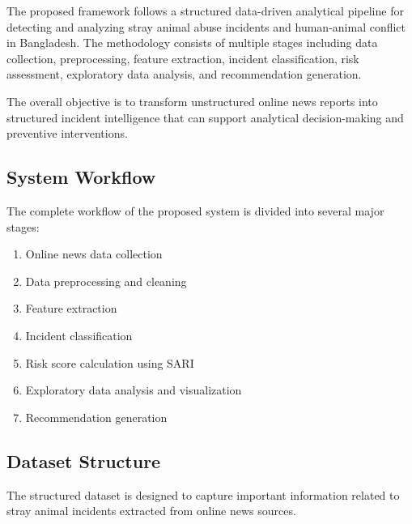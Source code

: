 \documentclass[conference]{IEEEtran}
\begin{document}
The proposed framework follows a structured data-driven analytical pipeline for detecting and analyzing stray animal abuse incidents and human-animal conflict in Bangladesh. The methodology consists of multiple stages including data collection, preprocessing, feature extraction, incident classification, risk assessment, exploratory data analysis, and recommendation generation.

The overall objective is to transform unstructured online news reports into structured incident intelligence that can support analytical decision-making and preventive interventions.

\subsection{System Workflow}

The complete workflow of the proposed system is divided into several major stages:

\begin{enumerate}
    \item Online news data collection
    \item Data preprocessing and cleaning
    \item Feature extraction
    \item Incident classification
    \item Risk score calculation using SARI
    \item Exploratory data analysis and visualization
    \item Recommendation generation
\end{enumerate}

\subsection{Dataset Structure}

The structured dataset is designed to capture important information related to stray animal incidents extracted from online news sources.
\end{document}
